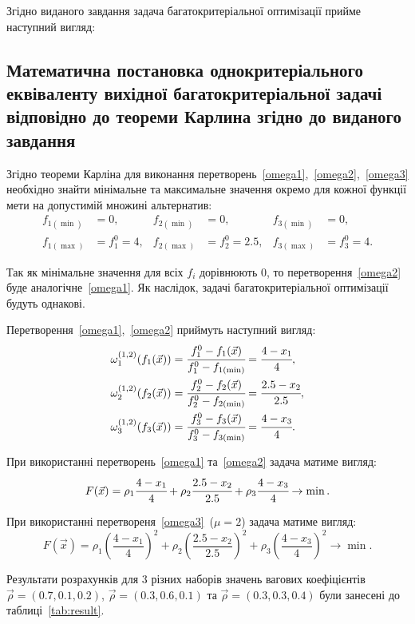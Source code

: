 Згідно виданого завдання задача багатокритеріальної оптимізації прийме наступний вигляд:


\subsection{Математична постановка однокритеріального еквіваленту вихідної багатокритеріальної задачі відповідно до теореми Карлина згідно до виданого завдання}

Згідно теореми Карліна для виконання перетворень~\eqref{omega1},~\eqref{omega2},~\eqref{omega3} необхідно знайти мінімальне та максимальне значення окремо для кожної функції мети на допустимій множині альтернатив:
\begin{align*}
    f_{1(\min)}&=0, &   f_{2(\min)}&=0, &   f_{3(\min)}&=0, \\
    f_{1(\max)}&=f_1^0=4,   &   f_{2(\max)}&=f_2^0=2.5, &   f_{3(\max)}&=f_3^0=4.
\end{align*}

Так як мінімальне значення для всіх $f_i$ дорівнюють $0$, то перетворення~\eqref{omega2} буде аналогічне~\eqref{omega1}. Як наслідок, задачі багатокритеріальної оптимізації будуть однакові.

Перетворення~\eqref{omega1},~\eqref{omega2} приймуть наступний вигляд:
\begin{align*}
\omega^{(1,2)}_1(f_1(\vec{x})) &= 
\cfrac{f_1^0-f_1(\vec{x})}{f_1^0 - f_{1(\min)}} =
\cfrac{4 - x_1}{4}, \\
\omega^{(1,2)}_2(f_2(\vec{x})) &= 
\cfrac{f_2^0-f_2(\vec{x})}{f_2^0 - f_{2(\min)}} =
\cfrac{2.5 - x_2}{2.5}, \\
\omega^{(1,2)}_3(f_3(\vec{x})) &= 
\cfrac{f_3^0-f_3(\vec{x})}{f_3^0 - f_{3(\min)}} =
\cfrac{4 - x_3}{4}.
\end{align*}

При використанні перетворень~\eqref{omega1} та~\eqref{omega2} задача матиме вигляд:
\[
F(\vec{x})=\rho_1\cfrac{4 - x_1}{4}+\rho_2\cfrac{2.5 - x_2}{2.5}+\rho_3\cfrac{4 - x_3}{4} \to \min.
\]

При використанні перетвореня~\eqref{omega3}~($\mu = 2$) задача матиме вигляд:
\[
F(\vec{x})=\rho_1\left(\frac{4 - x_1}{4}\right)^2+\rho_2\left(\frac{2.5 - x_2}{2.5}\right)^2+\rho_3\left(\frac{4 - x_3}{4}\right)^2 \to \min.
\]

Результати розрахунків для 3 різних наборів значень вагових коефіцієнтів $\vec{\rho} = (0.7, 0.1, 0.2)$, $\vec{\rho} = (0.3, 0.6, 0.1)$ та $\vec{\rho} = (0.3, 0.3, 0.4)$ були занесені до таблиці~\ref{tab:result}.

